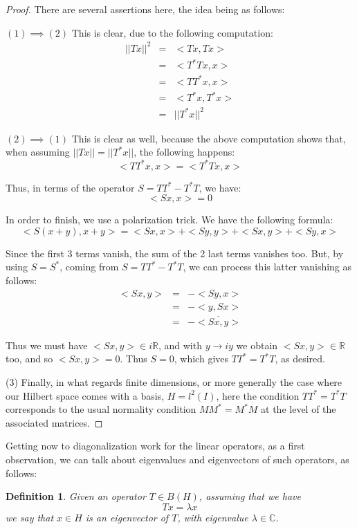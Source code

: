 \documentclass[12pt]{amsbook}
\newtheorem{definition}[theorem]{Definition}
\begin{document}
\begin{proof}
There are several assertions here, the idea being as follows:

\medskip

$(1)\implies(2)$ This is clear, due to the following computation:
\begin{eqnarray*}
||Tx||^2
&=&<Tx,Tx>\\
&=&<T^*Tx,x>\\
&=&<TT^*x,x>\\
&=&<T^*x,T^*x>\\
&=&||T^*x||^2
\end{eqnarray*}

$(2)\implies(1)$ This is clear as well, because the above computation shows that, when assuming $||Tx||=||T^*x||$, the following happens:
$$<TT^*x,x>=<T^*Tx,x>$$

Thus, in terms of the operator $S=TT^*-T^*T$, we have:
$$<Sx,x>=0$$

In order to finish, we use a polarization trick. We have the following formula:
$$<S(x+y),x+y>=<Sx,x>+<Sy,y>+<Sx,y>+<Sy,x>$$

Since the first 3 terms vanish, the sum of the 2 last terms vanishes too. But, by using $S=S^*$, coming from $S=TT^*-T^*T$, we can process this latter vanishing as follows:
\begin{eqnarray*}
<Sx,y>
&=&-<Sy,x>\\
&=&-<y,Sx>\\
&=&-\overline{<Sx,y>}
\end{eqnarray*}

Thus we must have $<Sx,y>\in i\mathbb R$, and with $y\to iy$ we obtain $<Sx,y>\in \mathbb R$ too, and so $<Sx,y>=0$. Thus $S=0$, which gives $TT^*=T^*T$, as desired.

\medskip

(3) Finally, in what regards finite dimensions, or more generally the case where our Hilbert space comes with a basis, $H=l^2(I)$, here the condition $TT^*=T^*T$ corresponds to the usual normality condition $MM^*=M^*M$ at the level of the associated matrices.
\end{proof}

Getting now to diagonalization work for the linear operators, as a first observation, we can talk about eigenvalues and eigenvectors of such operators, as follows:


\begin{definition}
Given an operator $T\in B(H)$, assuming that we have
$$Tx=\lambda x$$
we say that $x\in H$ is an eigenvector of $T$, with eigenvalue $\lambda\in\mathbb C$.
\end{definition}
\end{document}
